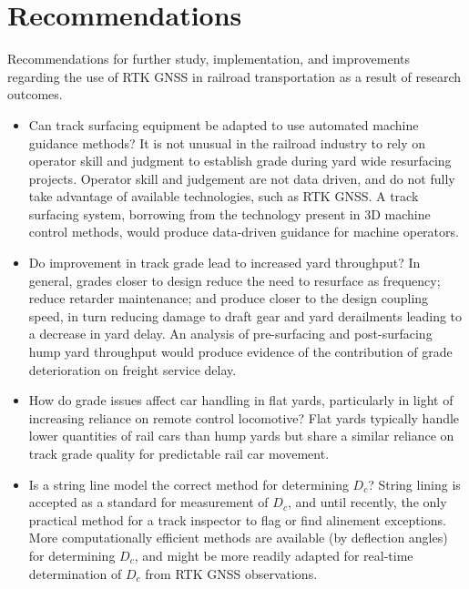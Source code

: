 \section{Recommendations}
Recommendations for further study, implementation, and improvements regarding the use of RTK GNSS in railroad transportation as a result of research outcomes.

\begin{itemize}
\item
Can track surfacing equipment be adapted to use automated machine guidance methods? It is not unusual in the railroad industry to rely on operator skill and judgment to establish grade during yard wide resurfacing projects. Operator skill and judgement are not data driven, and do not fully take advantage of available technologies, such as RTK GNSS. A track surfacing system, borrowing from the technology present in 3D machine control methods, would produce data-driven guidance for machine operators.

\item
Do improvement in track grade lead to increased yard throughput? In general, grades closer to design reduce the need to resurface as frequency; reduce retarder maintenance; and produce closer to the design coupling speed, in turn reducing damage to draft gear and yard derailments leading to a decrease in yard delay. An analysis of pre-surfacing and post-surfacing hump yard throughput would produce evidence of the contribution of grade deterioration on freight service delay.

\item
How do grade issues affect car handling in flat yards, particularly in light of increasing reliance on remote control locomotive? Flat yards typically handle lower quantities of rail cars than hump yards but share a similar reliance on track grade quality for predictable rail car movement.


\item
Is a string line model the correct method for determining ${D_c}$? String lining is accepted as a standard for measurement of ${D_c}$, and until recently, the only practical method for a track inspector to flag or find alinement exceptions. More computationally efficient methods are available (by deflection angles) for determining ${D_c}$, and might be more readily adapted for real-time determination of ${D_c}$ from RTK GNSS observations.


\end{itemize}
